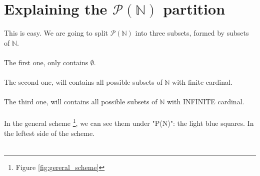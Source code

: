 \chapter{Explaining the $\mathcal{P}(\mathbb{N})$ partition}

	\noindent
	This is easy. We are going to split $\mathcal{P}(\mathbb{N})$ into three subsets, formed by subsets of $\mathbb{N}$.
	\\\\
	
	\noindent
	The first one, only contains $\emptyset$.
	\\\\
	
	\noindent
	The second one, will contains all possible subsets of $\mathbb{N}$ with finite cardinal.
	\\\\
	
	\noindent
	The third one, will contains all possible subsets of $\mathbb{N}$ with INFINITE cardinal.
	\\\\
	
	\noindent
	In the general scheme \footnote{Figure \ref{fig:gereral_scheme}}, we can see them under "P(N)": the light blue squares. In the leftest side of the scheme.
	\\\\
	
	
	
\newpage